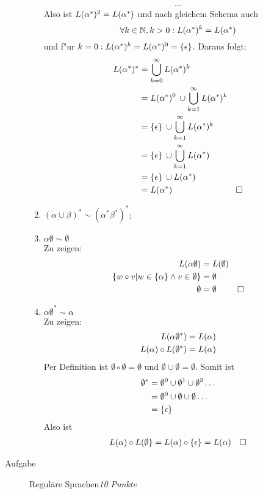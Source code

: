 \documentclass[a4paper,twoside,12pt,fleqn]{article}
\newcounter{AUFGNR}
\newcommand{\AUFGABE}[2]{\vspace{0.3cm}\item[Aufgabe~\arabic{AUFGNR}]\stepcounter{AUFGNR} #1\hfill\emph{#2}}
\newcommand{\N}{\mathbb{N}}
\begin{document}
\begin{description}
\begin{enumerate}
\begin{align*}
			\dots
		\end{align*}
		Also ist $L(\alpha^*)^2 = L(\alpha^*)$ und nach gleichem Schema auch\\
		\[ \forall k\in\N, k>0: L(\a^*)^k = L(\a^*) \]
		und f"ur $k = 0: L(\alpha^*)^k = L(\alpha^*)^0 = \{\epsilon\}$. Daraus folgt:\\
		\begin{align*}
			L(\alpha^*)^* &= \bigcup_{k=0}^\infty L(\alpha^*)^k\\
			&= L(\alpha^*)^0 \>\cup \bigcup_{k=1}^\infty L(\alpha^*)^k\\
			&= \{\epsilon\} \>\cup \bigcup_{k=1}^\infty L(\alpha^*)^k\\
			&= \{\epsilon\} \>\cup \bigcup_{k=1}^\infty L(\alpha^*)\\
			&= \{\epsilon\} \>\cup L(\alpha^*)\\
			&= L(\alpha^*) &\Box
		\end{align*}
		\item $(\alpha \cup \beta)^* \sim (\alpha^*\beta^*)^*$;
		\item $\alpha\emptyset \sim \emptyset$\\
			Zu zeigen:
			\begin{align*}
				L(\alpha\emptyset) &= L(\emptyset)\\
				\{w \circ v | w \in \{ \alpha \} \wedge v \in \emptyset\} &= \emptyset\\
				\emptyset &= \emptyset &\Box
			\end{align*}
		\item $\alpha\emptyset^* \sim \alpha$\\
			Zu zeigen:
			\begin{align*}
				L(\alpha\emptyset^*) &= L(\alpha)\\
				L(\alpha)\circ L(\emptyset^*) &= L(\alpha)
			\end{align*}
			Per Definition ist $\emptyset\circ\emptyset=\emptyset$ und
			$\emptyset\cup\emptyset=\emptyset$. Somit ist
			\begin{align*}
				\emptyset^* &= \emptyset^0 \cup \emptyset^1 \cup \emptyset^2 \dots\\
				&= \emptyset^0 \cup \emptyset \cup \emptyset \dots\\
				&= \{\epsilon\}
			\end{align*}
			Also ist
			\begin{align*}
				L(\alpha) \circ L(\emptyset\} = L(\alpha) \circ \{\epsilon\} = L(\alpha) &&\Box
			\end{align*}
	\end{enumerate}
	\newpage

	\AUFGABE{Regul\"are Sprachen}{10 Punkte}


\end{description}
\end{document}
